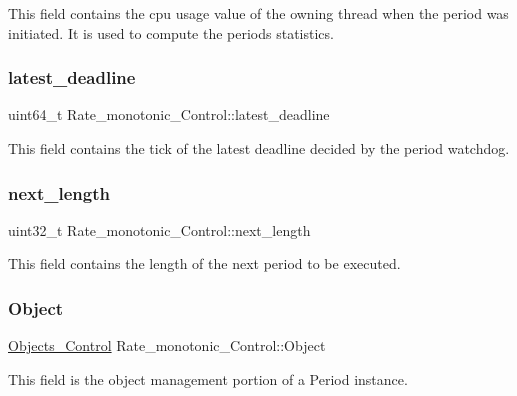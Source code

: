 This field contains the cpu usage value of the owning thread when the period was initiated. It is used to compute the period\textquotesingle{}s statistics. \mbox{\label{structRate__monotonic__Control_af8d39ea22c9c2a17d0362cc2f054b6b6}} 
\subsubsection{\texorpdfstring{latest\_deadline}{latest\_deadline}}
{\footnotesize\ttfamily uint64\+\_\+t Rate\+\_\+monotonic\+\_\+\+Control\+::latest\+\_\+deadline}

This field contains the tick of the latest deadline decided by the period watchdog. \mbox{\label{structRate__monotonic__Control_a3565f22c218535127cdcc2e3d7e6953b}} 
\subsubsection{\texorpdfstring{next\_length}{next\_length}}
{\footnotesize\ttfamily uint32\+\_\+t Rate\+\_\+monotonic\+\_\+\+Control\+::next\+\_\+length}

This field contains the length of the next period to be executed. \mbox{\label{structRate__monotonic__Control_a03fc19c9c36d03112da8ec05cc9f5054}} 
\subsubsection{\texorpdfstring{Object}{Object}}
{\footnotesize\ttfamily \mbox{\hyperlink{structObjects__Control}{Objects\+\_\+\+Control}} Rate\+\_\+monotonic\+\_\+\+Control\+::\+Object}

This field is the object management portion of a Period instance. \mbox{\label{structRate__monotonic__Control_ad6d997fcb87f49af5896722a34da7244}} 
